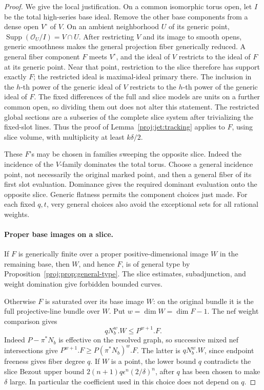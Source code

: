 \documentclass[11pt,letterpaper]{article}
\theoremstyle{definition}
\theoremstyle{remark}
\begin{document}
\begin{proof}
We give the local justification.  On a common isomorphic torus
open, let \(I\) be the total high-series base ideal.  Remove the
other base components from a dense open \(V^\circ\) of \(V\).
On an ambient neighborhood \(U\) of its generic point,
\(\operatorname{Supp}(\mathcal{O}_U/I)=V\cap U\).
After restricting \(V\) and its image to smooth opens, generic
smoothness makes the general projection fiber generically reduced.
A general fiber component \(F\) meets \(V^\circ\), and the ideal
of \(V\) restricts to the ideal of \(F\) at its generic point.
Near that point,
restriction to the slice therefore has support exactly \(F\);
the restricted ideal is maximal-ideal primary there.  The inclusion
in the \(h\)-th power of the generic ideal of \(V\) restricts to
the \(h\)-th power of the generic ideal of \(F\).
The fixed differences of the full and slice models are units on
a further common open, so dividing them out does not alter this
statement.  The restricted global sections are a subseries of
the complete slice system after trivializing the fixed-slot lines.
Thus the proof of Lemma~\ref{proj:jet:tracking} applies to \(F\), using
slice volume, with multiplicity at least \(k\delta/2\).

These \(F\)'s may be chosen in families sweeping the opposite
slice.  Indeed the incidence of the \(V\)-family dominates the
total torus.  Choose a general incidence point, not necessarily
the original marked point, and then a general fiber of its first
slot evaluation.  Dominance gives the required dominant evaluation
onto the opposite slice.  Generic flatness permits the component
choices just made.  For each fixed \(q,t\), very general choices
also avoid the exceptional sets for all rational weights.

\paragraph{Proper base images on a slice.}
If \(F\) is generically finite over a proper positive-dimensional
image \(W\) in the remaining base, then \(W\), and hence \(F\), is
of general type by Proposition~\ref{proj:prop:general-type}.
The slice estimates, subadjunction, and weight domination give
forbidden bounded curves.

Otherwise \(F\) is saturated over its base image \(W\): on the
original bundle it is the full projective-line bundle over \(W\).
Put \(w=\dim W=\dim F-1\).  The nef weight comparison gives
\begin{equation}\label{proj:jet:saturated-degree}
 qN_b^w.W\le P^{w+1}.F.
\end{equation}
Indeed \(P-\pi^*N_b\) is effective on the resolved graph, so
successive mixed nef intersections give
\(P^{w+1}.F\ge P(\pi^*N_b)^w.F\).  The latter is
\(qN_b^w.W\), since endpoint freeness gives fiber degree \(q\).
If \(W\) is a point, the lower bound \(q\) contradicts the slice
Bezout upper bound \(2(n+1)q\epsilon^n(2/\delta)^n\), after \(q\)
has been chosen to make \(\delta\) large.  In particular the
coefficient used in this choice does not depend on \(q\).


\end{proof}
\end{document}
